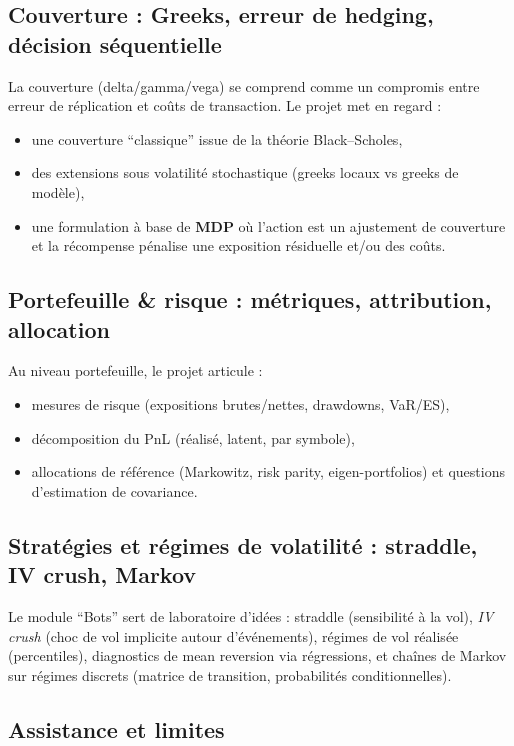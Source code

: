 \documentclass[11pt,a4paper]{article}
\newcommand{\1}{\mathbf{1}}
\begin{document}
\subsection{Couverture : Greeks, erreur de hedging, d\'ecision s\'equentielle}

La couverture (delta/gamma/vega) se comprend comme un compromis entre erreur de r\'eplication et co\^uts de transaction.
Le projet met en regard :
\begin{itemize}
  \item une couverture ``classique'' issue de la th\'eorie Black--Scholes,
  \item des extensions sous volatilit\'e stochastique (greeks locaux vs greeks de mod\`ele),
  \item une formulation \`a base de \textbf{MDP} o\`u l'action est un ajustement de couverture et la r\'ecompense p\'enalise
        une exposition r\'esiduelle et/ou des co\^uts.
\end{itemize}

\subsection{Portefeuille \& risque : m\'etriques, attribution, allocation}

Au niveau portefeuille, le projet articule :
\begin{itemize}
  \item mesures de risque (expositions brutes/nettes, drawdowns, VaR/ES),
  \item d\'ecomposition du PnL (r\'ealis\'e, latent, par symbole),
  \item allocations de r\'ef\'erence (Markowitz, risk parity, eigen-portfolios) et questions d'estimation de covariance.
\end{itemize}

\subsection{Strat\'egies et r\'egimes de volatilité : straddle, IV crush, Markov}

Le module ``Bots'' sert de laboratoire d'id\'ees : straddle (sensibilit\'e \`a la vol), \emph{IV crush} (choc de vol
implicite autour d'\'ev\'enements), r\'egimes de vol r\'ealis\'ee (percentiles), diagnostics de mean reversion via
r\'egressions, et cha\^ines de Markov sur r\'egimes discrets (matrice de transition, probabilit\'es conditionnelles).

\subsection{Assistance et limites}
\end{document}
